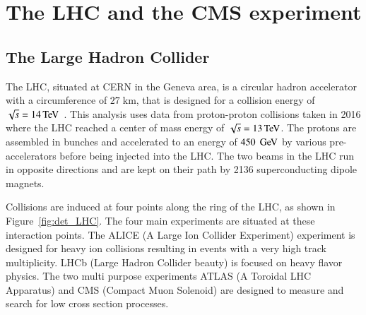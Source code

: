
\chapter{The LHC and the CMS experiment}
\label{sec:det}

\section{The Large Hadron Collider}
\label{det:LHC}

The LHC, situated at CERN in the Geneva area, is a circular hadron accelerator with a circumference of $27 \; \mathrm{km}$, that is designed for a collision energy of $\sqrt{s} = 14  \,\text{Te\hspace{-.08em}V}$~\cite{1748-0221-3-08-S08001}.
This analysis uses data from proton-proton collisions taken in 2016 where the LHC reached a center of mass energy of $\sqrt{s}= 13  \,\text{Te\hspace{-.08em}V}$.
The protons are assembled in bunches and accelerated to an energy of  $450 \; \,\text{Ge\hspace{-.08em}V}$ by various pre-accelerators before being injected into the LHC.
The two beams in the LHC run in opposite directions and are kept on their path by 2136 superconducting dipole magnets.

Collisions are induced at four points along the ring of the LHC, as shown in Figure~\ref{fig:det_LHC}. The four main experiments are situated at these interaction points.
The ALICE (A Large Ion Collider Experiment) experiment is designed for heavy ion collisions resulting in events with a very high track multiplicity.
LHCb (Large Hadron Collider beauty) is focused on heavy flavor physics.
The two multi purpose experiments ATLAS (A Toroidal LHC Apparatus) and CMS (Compact Muon Solenoid) are designed to measure and search for low cross section processes.

